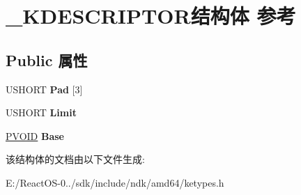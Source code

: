 \hypertarget{struct___k_d_e_s_c_r_i_p_t_o_r}{}\section{\+\_\+\+K\+D\+E\+S\+C\+R\+I\+P\+T\+O\+R结构体 参考}
\label{struct___k_d_e_s_c_r_i_p_t_o_r}
\subsection*{Public 属性}
\begin{DoxyCompactItemize}
\item 
\mbox{\label{struct___k_d_e_s_c_r_i_p_t_o_r_a7816715bc89a2c6560d9ad10ed763997}} 
U\+S\+H\+O\+RT {\bfseries Pad} \mbox{[}3\mbox{]}
\item 
\mbox{\label{struct___k_d_e_s_c_r_i_p_t_o_r_ae19ff3f2424b543c64dbb2e5d9582596}} 
U\+S\+H\+O\+RT {\bfseries Limit}
\item 
\mbox{\label{struct___k_d_e_s_c_r_i_p_t_o_r_a54548c645496462d3bc54822674b9f74}} 
\hyperlink{interfacevoid}{P\+V\+O\+ID} {\bfseries Base}
\end{DoxyCompactItemize}


该结构体的文档由以下文件生成\+:\begin{DoxyCompactItemize}
\item 
E\+:/\+React\+O\+S-\/0../sdk/include/ndk/amd64/ketypes.\+h\end{DoxyCompactItemize}
